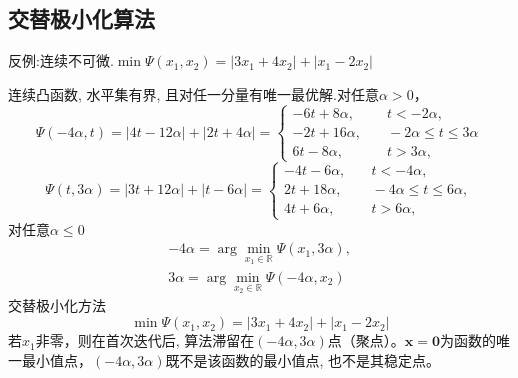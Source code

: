 \subsection{交替极小化算法}
\begin{example}
    反例:连续不可微.$\min\Psi(x_1,x_2)=|3x_1+4x_2|+|x_1-2x_2|$
    \begin{solution}
        连续凸函数, 水平集有界, 且对任一分量有唯一最优解.对任意$\alpha>0$，
        \[
            \Psi(-4\alpha,t)=|4t-12\alpha|+|2t+4\alpha|=
            \begin{cases}-6t+8\alpha,&\quad t<-2\alpha,\\
                -2t+16\alpha,&\quad-2\alpha\leqslant t\leqslant 3\alpha\\
                6t-8\alpha,&\quad t>3\alpha,
            \end{cases}
        \]
        \[
            \Psi(t,3\alpha)=|3t+12\alpha|+|t-6\alpha|=
            \begin{cases}
                -4t-6\alpha,&\quad t<-4\alpha,\\
                2t+18\alpha,&\quad-4\alpha\leqslant t\leqslant6\alpha,\\
                4t+6\alpha,&\quad t>6\alpha,
            \end{cases}
        \]
        对任意$\alpha\leqslant 0$
        \[
            \begin{array}{l}
                -4\alpha=\arg\min_{x_{1}\in \mathbb{R}}\Psi(x_{1},3\alpha),\\3\alpha=\arg\min_{x_{2}\in \mathbb{R}}\Psi(-4\alpha,x_{2})
            \end{array}
        \]
        交替极小化方法
        \[
            \min\Psi(x_{1},x_{2})=|3x_{1}+4x_{2}|+|x_{1}-2x_{2}|
        \]
        若$x_1$非零，则在首次迭代后, 算法滞留在\colorbox{cyan!50}{$(-4\alpha,3\alpha)$点（聚点）}。\newline$\boldsymbol{x} = \boldsymbol{0}$为函数的唯一最小值点，$(-4\alpha,3\alpha)$既不是该函数的最小值点, 也不是其稳定点。
    \end{solution}    
\end{example}

